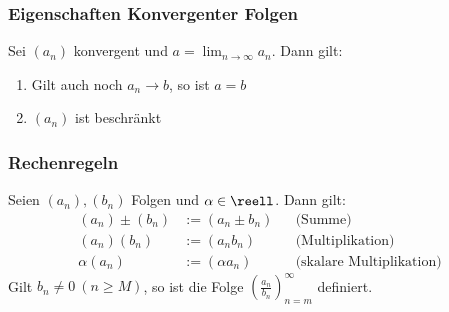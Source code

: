 \documentclass{kit}
\begin{document}
    \subsubsection{Eigenschaften Konvergenter Folgen}
      Sei $(a_n)$ konvergent und $a=\lim_{n\rightarrow\infty}a_n$. Dann gilt:
      \begin{enumerate}
        \item Gilt auch noch $a_n\rightarrow b$, so ist $a=b$
        \item $(a_n)$ ist beschränkt
      \end{enumerate}
    \subsubsection{Rechenregeln}
      Seien $(a_n),(b_n)$ Folgen und $\alpha\in\reell$. Dann gilt:
      \begin{align*}
        (a_n)\pm(b_n) & :=(a_n\pm b_n) && \text{(Summe)}\\
        (a_n)(b_n)&:=(a_nb_n) && \text{(Multiplikation)}\\
        \alpha(a_n) & :=(\alpha a_n) && \text{(skalare Multiplikation)}
      \end{align*}
      Gilt $b_n\neq0\ (n\ge M)$, so ist die Folge $\left(\frac{a_n}{b_n}\right)^\infty_{n=m}$ definiert.
\end{document}
